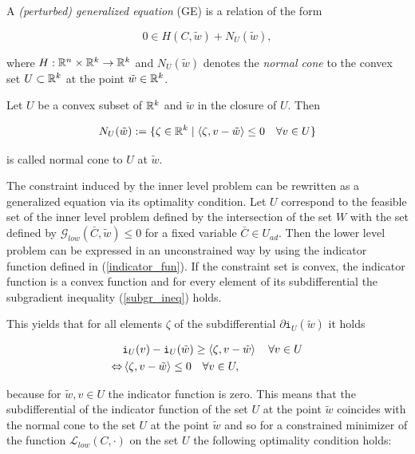 A \emph{(perturbed) generalized equation} (GE) is a relation of the form

\begin{equation}
	0 \in H(C,\tilde{w})+N_{U}(\tilde{w}), 
	\label{GE_gen}
\end{equation}

where \(H:\mathbb{R}^n\times \mathbb{R}^k \to \mathbb{R}^k\) and \(N_{U}(\tilde{w})\) denotes the \emph{normal cone} to the convex set \(U \subset \mathbb{R}^k\) at the point \(\tilde{w}\in \mathbb{R}^k\).

\begin{definition}
	Let \(U\) be a convex subset of \(\mathbb{R}^k\) and \(\tilde{w}\) in the closure of \(U\). Then
	
	\begin{equation*}
		N_U(\tilde{w}) := \{\zeta\in \mathbb{R}^k \mid \left\langle \zeta,v-\tilde{w}\right\rangle \leq 0 \quad \forall v \in U \}
	\label{norm_cone}
	\end{equation*}
	
	is called normal cone to \(U\) at \(\tilde{w}\).
\end{definition}
 
The constraint induced by the inner level problem can be rewritten as a generalized equation via its optimality condition.
Let \(U\) correspond to the feasible set of the inner level problem defined by the intersection of the set \(W\) with the set defined by \(\mathcal{G}_{low}(\bar{C},\tilde{w})\leq 0\) for a fixed variable \(\bar{C} \in U_{ad} \).
Then the lower level problem can be expressed in an unconstrained way by using the indicator function defined in (\ref{indicator_fun}). If the constraint set is convex, the indicator function is a convex function and for every element of its subdifferential the subgradient inequality (\ref{subgr_ineq}) holds.

This yields that for all elements \(\zeta\) of the subdifferential \(\partial \mathtt{i}_U(\tilde{w})\) it holds

\begin{equation*}
\begin{split}
	&\mathtt{i}_U(v)-\mathtt{i}_U(\tilde{w}) \geq \left\langle \zeta, v-\tilde{w}\right\rangle \quad \forall v \in U \\
	\Leftrightarrow & \left\langle \zeta, v-\tilde{w}\right\rangle \leq 0 \quad \forall v \in U,
\end{split}
\end{equation*}

because for \(\tilde{w},v \in U\) the indicator function is zero. This means that the subdifferential of the indicator function of the set \(U\) at the point \(\tilde{w}\) coincides with the normal cone to the set \(U\) at the point \(\tilde{w}\) and so for a constrained minimizer of the function \(\mathcal{L}_{low}(C,\cdot)\) on the set \(U\) the following optimality condition holds:

